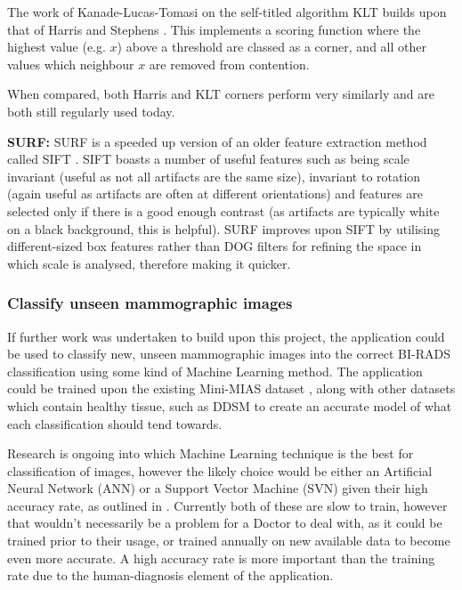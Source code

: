 The work of Kanade-Lucas-Tomasi on the self-titled algorithm \acrshort{KLT} builds upon that of Harris and Stephens \cite{Shi_Tomasi_1994} \cite{tomasi2004detection}. This implements a scoring function where the highest value (e.g. $x$) above a threshold are classed as a corner, and all other values which neighbour $x$ are removed from contention.

When compared, both Harris and KLT corners perform very similarly and are both still regularly used today.

\noindent \textbf{SURF: } \acrfull{SURF} \cite{Bay_Tuytelaars_Gool_2006} is a speeded up version of an older feature extraction method called \acrfull{SIFT} \cite{Lowe_1999}. \acrshort{SIFT} boasts a number of useful features such as being scale invariant (useful as not all artifacts are the same size), invariant to rotation (again useful as artifacts are often at different orientations) and features are selected only if there is a good enough contrast (as artifacts are typically white on a black background, this is helpful). \acrshort{SURF} improves upon \acrshort{SIFT} by utilising different-sized box features rather than \acrfull{DOG} filters for refining the space in which scale is analysed, therefore making it quicker.

\subsubsection{Classify unseen mammographic images}

If further work was undertaken to build upon this project, the application could be used to classify new, unseen mammographic images into the correct BI-RADS classification using some kind of Machine Learning method. The application could be trained upon the existing Mini-MIAS dataset \cite{Suckling_1994}, along with other datasets which contain healthy tissue, such as \acrshort{DDSM} \cite{Heath_Bowyer_Kopans_Moore_Kegelmeyer_Processing} \cite{Heath_Bowyer_Kopans_Kegelmeyer_Moore_Chang_MunishKumaran_1998} to create an accurate model of what each classification should tend towards.

Research is ongoing into which Machine Learning technique is the best for classification of images, however the likely choice would be either an Artificial Neural Network (ANN) or a Support Vector Machine (SVN) given their high accuracy rate, as outlined in \cite{kotsiantis2007supervised}. Currently both of these are slow to train, however that wouldn't necessarily be a problem for a Doctor to deal with, as it could be trained prior to their usage, or trained annually on new available data to become even more accurate. A high accuracy rate is more important than the training rate due to the human-diagnosis element of the application.

